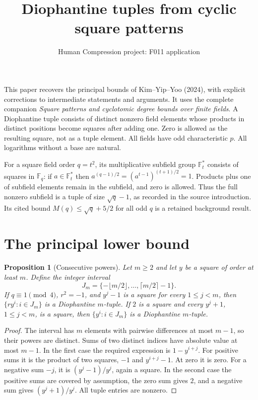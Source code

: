 \documentclass[11pt,a4paper]{article}
\title{Diophantine tuples from cyclic square patterns}
\author{Human Compression project: F011 application}
\date{}
\newtheorem{proposition}[theorem]{Proposition}
\newcommand{\F}{\mathbb F}
\begin{document}
\maketitle
This paper recovers the principal bounds of Kim--Yip--Yoo (2024),
with explicit corrections to intermediate statements and arguments.
It uses the complete companion \emph{Square patterns and cyclotomic degree
bounds over finite fields}. A Diophantine tuple consists of distinct
nonzero field elements whose products in distinct positions become squares
after adding one. Zero is allowed as the resulting square, not as a tuple
element. All fields have odd characteristic $p$. All logarithms without a
base are natural.

For a square field order $q=t^2$, its multiplicative subfield group
$\F_t^*$ consists of squares in $\F_q$: if $a\in\F_t^*$ then
$a^{(q-1)/2}=(a^{t-1})^{(t+1)/2}=1$. Products plus one of subfield
elements remain in the subfield, and zero is allowed. Thus the full
nonzero subfield is a tuple of size $\sqrt q-1$, as recorded in the
source introduction. Its cited bound $M(q)\le\sqrt q+5/2$ for all odd
$q$ is a retained background result.

\section{The principal lower bound}
\begin{proposition}[Consecutive powers]\label{powers}
Let $m\ge2$ and let $y$ be a square of order at least $m$. Define the
integer interval
\[
 J_m=\{-\lfloor m/2\rfloor,\ldots,\lceil m/2\rceil-1\}.
\]
If $q\equiv1\pmod4$, $r^2=-1$, and $y^j-1$ is a square for every
$1\le j<m$, then $\{ry^i:i\in J_m\}$ is a Diophantine $m$-tuple.
If $2$ is a square and every $y^j+1$, $1\le j<m$, is a square, then
$\{y^i:i\in J_m\}$ is a Diophantine $m$-tuple.
\end{proposition}
\begin{proof}
The interval has $m$ elements with pairwise differences at most $m-1$,
so their powers are distinct. Sums of two distinct indices have absolute
value at most $m-1$. In the first case the required expression is
$1-y^{i+j}$. For positive sums it is the product of two squares,
$-1$ and $y^{i+j}-1$. At zero it is zero. For a negative sum $-j$,
it is $(y^j-1)/y^j$, again a square. In the second case the positive
sums are covered by assumption, the zero sum gives $2$, and a negative
sum gives $(y^j+1)/y^j$. All tuple entries are nonzero.
\end{proof}
\end{document}
